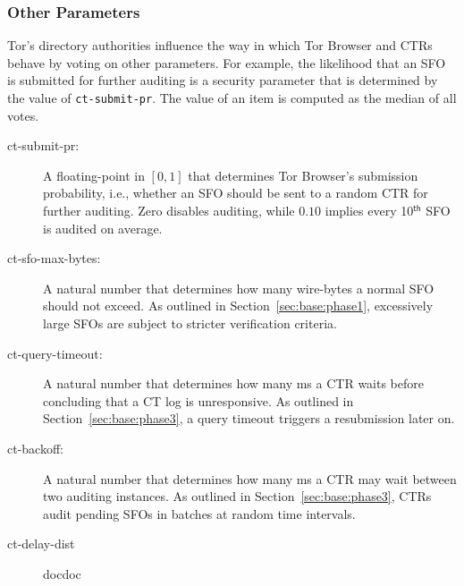 \subsubsection{Other Parameters} \label{sec:base:consensus:params}
Tor's directory authorities influence the way in which Tor Browser and CTRs
behave by voting on other parameters.  For example, the likelihood that
an SFO is submitted for further auditing is a security parameter that is
determined by the value of \texttt{ct-submit-pr}.  The value of an item is
computed as the median of all votes.
\begin{description}
	\item[ct-submit-pr:] A floating-point in $[0,1]$ that determines Tor
		Browser's submission probability, i.e., whether an SFO should be sent to
		a random CTR for further auditing.  Zero disables auditing,
		while $0.10$ implies every 10$^{\mathsf{th}}$ SFO is audited
		on average.
	\item[ct-sfo-max-bytes:] A natural number that determines how many
		wire-bytes a normal SFO should not exceed.  As outlined in
		Section~\ref{sec:base:phase1}, excessively large SFOs are subject
		to stricter verification criteria.
	\item[ct-query-timeout:] A natural number that determines how many ms a CTR
		waits before concluding that a CT log is unresponsive.  As outlined in
		Section~\ref{sec:base:phase3}, a query timeout triggers a
		resubmission later on.
	\item[ct-backoff:] A natural number that determines how many ms a CTR
		may wait between two auditing instances.  As outlined in
		Section~\ref{sec:base:phase3}, CTRs audit pending SFOs
		in batches at random time intervals.
	\item[ct-delay-dist] docdoc
\end{description}


